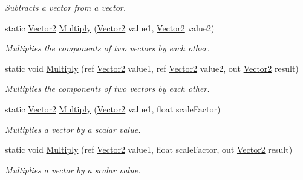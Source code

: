\begin{DoxyCompactItemize}
\begin{DoxyCompactList}\small\item\em Subtracts a vector from a vector.\end{DoxyCompactList}\item 
static \hyperlink{struct_microsoft_1_1_xna_1_1_framework_1_1_vector2}{Vector2} \hyperlink{struct_microsoft_1_1_xna_1_1_framework_1_1_vector2_afe9cb27575b53aed60ce1a2e0a8ad5ea}{Multiply} (\hyperlink{struct_microsoft_1_1_xna_1_1_framework_1_1_vector2}{Vector2} value1, \hyperlink{struct_microsoft_1_1_xna_1_1_framework_1_1_vector2}{Vector2} value2)
\begin{DoxyCompactList}\small\item\em Multiplies the components of two vectors by each other.\end{DoxyCompactList}\item 
static void \hyperlink{struct_microsoft_1_1_xna_1_1_framework_1_1_vector2_a048f00989327ed10f1be5aed272353ea}{Multiply} (ref \hyperlink{struct_microsoft_1_1_xna_1_1_framework_1_1_vector2}{Vector2} value1, ref \hyperlink{struct_microsoft_1_1_xna_1_1_framework_1_1_vector2}{Vector2} value2, out \hyperlink{struct_microsoft_1_1_xna_1_1_framework_1_1_vector2}{Vector2} result)
\begin{DoxyCompactList}\small\item\em Multiplies the components of two vectors by each other.\end{DoxyCompactList}\item 
static \hyperlink{struct_microsoft_1_1_xna_1_1_framework_1_1_vector2}{Vector2} \hyperlink{struct_microsoft_1_1_xna_1_1_framework_1_1_vector2_a33245a6351b32079625deb37d826d8fd}{Multiply} (\hyperlink{struct_microsoft_1_1_xna_1_1_framework_1_1_vector2}{Vector2} value1, float scale\+Factor)
\begin{DoxyCompactList}\small\item\em Multiplies a vector by a scalar value.\end{DoxyCompactList}\item 
static void \hyperlink{struct_microsoft_1_1_xna_1_1_framework_1_1_vector2_a29750eb00961435a73e46f1d1eb112d4}{Multiply} (ref \hyperlink{struct_microsoft_1_1_xna_1_1_framework_1_1_vector2}{Vector2} value1, float scale\+Factor, out \hyperlink{struct_microsoft_1_1_xna_1_1_framework_1_1_vector2}{Vector2} result)
\begin{DoxyCompactList}\small\item\em Multiplies a vector by a scalar value.\end{DoxyCompactList}\item 

\end{DoxyCompactItemize}
